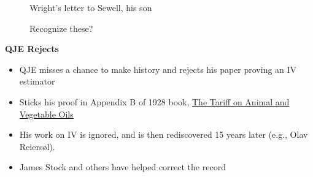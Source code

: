 \documentclass[notes=show]{beamer}
\begin{document}
\begin{frame}[plain]


\centering
  \begin{overprint}%
\begin{figure}[h]
\caption{Wright's letter to Sewell, his son}
\end{figure}
  \end{overprint}%

\end{frame}


\begin{frame}[plain]


\centering
  \begin{overprint}%
\begin{figure}[h]
\caption{Recognize these?}
\end{figure}
  \end{overprint}%

\end{frame}


\begin{frame}[plain]
\begin{center}
\textbf{QJE Rejects}
\end{center}

\begin{itemize}
\item QJE misses a chance to make history and rejects his paper proving an IV estimator
\item Sticks his proof in Appendix B of 1928 book, \underline{The Tariff on Animal and Vegetable Oils}
\item His work on IV is ignored, and is then rediscovered 15 years later (e.g., Olav Reiers\o l). 
\item James Stock and others have helped correct the record
\end{itemize}

\end{frame}
\end{document}
